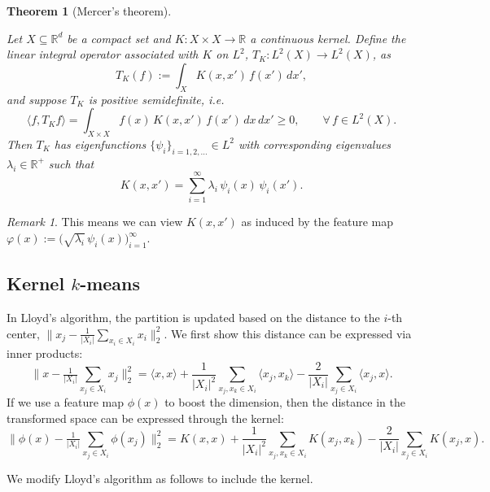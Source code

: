 \documentclass[
  letterpaper,
  DIV=11,
  numbers=noendperiod]{scrreprt}
\theoremstyle{definition}
\theoremstyle{plain}
\newtheorem{theorem}{Theorem}[chapter]
\theoremstyle{plain}
\theoremstyle{definition}
\theoremstyle{plain}
\theoremstyle{plain}
\theoremstyle{remark}
\newtheorem*{remark}{Remark}
\begin{document}
\begin{theorem}[Mercer's
theorem]\protect\hypertarget{thm-mercer}{}\label{thm-mercer}

Let \(X \subseteq \mathbb{R}^d\) be a compact set and
\(K : X \times X \to \mathbb{R}\) a continuous kernel. Define the linear
integral operator associated with \(K\) on \(L^2\),
\(T_K : L^2(X) \to L^2(X)\), as \[
T_K(f) := \int_X K(x, x')\, f(x')\, dx',
\] and suppose \(T_K\) is positive semidefinite, i.e. \[
\langle f, T_K f\rangle = \int_{X \times X} f(x)\, K(x, x')\, f(x')\, dx\, dx' \ge 0, \qquad \forall\, f \in L^2(X).
\] Then \(T_K\) has eigenfunctions \(\{\psi_i\}_{i=1,2,\dots} \in L^2\)
with corresponding eigenvalues \(\lambda_i \in \mathbb{R}^+\) such that
\[
K(x, x') = \sum_{i=1}^{\infty} \lambda_i\, \psi_i(x)\, \psi_i(x').
\]

\end{theorem}

\begin{remark}
This means we can view \(K(x, x')\) as induced by the feature map
\(\varphi(x) := \big(\sqrt{\lambda_i}\, \psi_i(x)\big)_{i=1}^{\infty}\).
\end{remark}

\subsection{\texorpdfstring{Kernel
\(k\)-means}{Kernel k-means}}\label{kernel-k-means}

In Lloyd's algorithm, the partition is updated based on the distance to
the \(i\)-th center,
\(\big\| x_j - \tfrac{1}{|X_i|} \sum_{x_i \in X_i} x_i \big\|_2^2\). We
first show this distance can be expressed via inner products: \[
\Big\| x - \tfrac{1}{|X_i|} \sum_{x_j \in X_i} x_j \Big\|_2^2
= \langle x, x\rangle + \frac{1}{|X_i|^2} \sum_{x_j, x_k \in X_i} \langle x_j, x_k\rangle - \frac{2}{|X_i|} \sum_{x_j \in X_i} \langle x_j, x\rangle .
\] If we use a feature map \(\phi(x)\) to boost the dimension, then the
distance in the transformed space can be expressed through the kernel:
\[
\Big\| \phi(x) - \tfrac{1}{|X_i|} \sum_{x_j \in X_i} \phi(x_j) \Big\|_2^2
= K(x, x) + \frac{1}{|X_i|^2} \sum_{x_j, x_k \in X_i} K(x_j, x_k) - \frac{2}{|X_i|} \sum_{x_j \in X_i} K(x_j, x) .
\]

We modify Lloyd's algorithm as follows to include the kernel.
\end{document}
